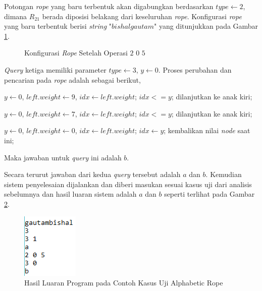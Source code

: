 Potongan \textit{rope} yang baru terbentuk akan digabungkan berdasarkan $type \gets 2$, dimana $R_{21}$ berada diposisi belakang dari keseluruhan \textit{rope}. Konfigurasi \textit{rope} yang baru terbentuk berisi \textit{string} "$bishalgautam$" yang ditunjukkan pada Gambar \ref{fig:konfigurasi-3}.
\begin{figure}[h]
\centering
{}
\caption{Konfigurasi \textit{Rope} Setelah Operasi $2$ $0$ $5$ \label{fig:konfigurasi-3}}
\end{figure}

\textit{Query} ketiga memiliki parameter $type \gets 3$, $y \gets 0$. Proses perubahan dan pencarian pada \textit{rope} adalah sebagai berikut,

$y \gets 0$, $left.weight \gets 9$, $idx \gets left.weight$; $idx <= y$;
dilanjutkan ke anak kiri;

$y \gets 0$, $left.weight \gets 7$, $idx \gets left.weight$; $idx <= y$;
dilanjutkan ke anak kiri;

$y \gets 0$, $left.weight \gets 0$, $idx \gets left.weight$; $idx \gets y$;
kembalikan nilai \textit{node} saat ini;

Maka jawaban untuk \textit{query} ini adalah $b$.

Secara terurut jawaban dari kedua \textit{query} tersebut adalah $a$ dan $b$. Kemudian sistem penyelesaian dijalankan dan diberi masukan sesuai kasus uji dari analisis sebelumnya dan hasil luaran sistem adalah $a$ dan $b$ seperti terlihat pada Gambar \ref{fig:hasil-luaran}.
\begin{figure}[H]
\centerline{ \includegraphics[scale=0.6]{assets/images/hasil.png}}
\caption{Hasil Luaran Program pada Contoh Kasus Uji Alphabetic Rope}
\label{fig:hasil-luaran}
\end{figure}

